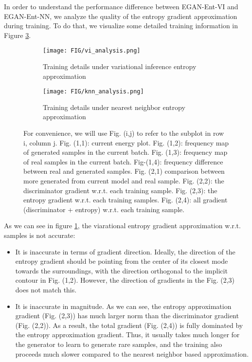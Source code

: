 \documentclass[a4paper]{article}
\begin{document}
In order to understand the performance difference between EGAN-Ent-VI and EGAN-Ent-NN, we analyze the quality of the entropy gradient approximation during training.
To do that, we visualize some detailed training information in Figure \ref{fig:entropy_gradient_analysis}.
\begin{figure}[h]
	\centering
	\begin{subfigure}{\textwidth}
		\texttt{[image: FIG/vi\_analysis.png]}
        \caption{Training details under variational inference entropy approximation}
        \label{fig:entropy_gradient_vi}
	\end{subfigure}
    \begin{subfigure}{\textwidth}
		\texttt{[image: FIG/knn\_analysis.png]}
        \caption{Training details under nearest neighbor entropy approximation}
        \label{fig:entropy_gradient_knn}
	\end{subfigure}
	\caption{For convenience, we will use Fig. (i,j) to refer to the subplot in row i, column j. Fig. (1,1): current energy plot. Fig. (1,2): frequency map of generated samples in the current batch. Fig. (1,3): frequency map of real samples in the current batch. Fig-(1,4): frequency difference between real and generated samples. Fig. (2,1) comparison between more generated from current model and real sample. Fig. (2,2): the discriminator gradient w.r.t. each training sample. Fig. (2,3): the entropy gradient w.r.t. each training samples. Fig. (2,4): all gradient (discriminator + entropy) w.r.t. each training sample.}
	\label{fig:entropy_gradient_analysis}
\end{figure}

As we can see in figure \ref{fig:entropy_gradient_vi}, the viarational entropy gradient approximation w.r.t. samples is not accurate:
\begin{itemize}
\item It is inaccurate in terms of gradient direction. 
Ideally, the direction of the entropy gradient should be pointing from the center of its closest mode towards the surroundings, with the direction orthogonal to the implicit contour in Fig. (1,2).
However, the direction of gradients in the Fig. (2,3) does not match this. 

\item It is inaccurate in magnitude. 
As we can see, the entropy approximation gradient (Fig. (2,3)) has much larger norm than the discriminator gradient (Fig. (2,2)). 
As a result, the total gradient (Fig. (2,4)) is fully dominated by the entropy approximation gradient.
Thus, it usually takes much longer for the generator to learn to generate rare samples, and the training also proceeds much slower compared to the nearest neighbor based approximation.
\end{itemize}
\end{document}
